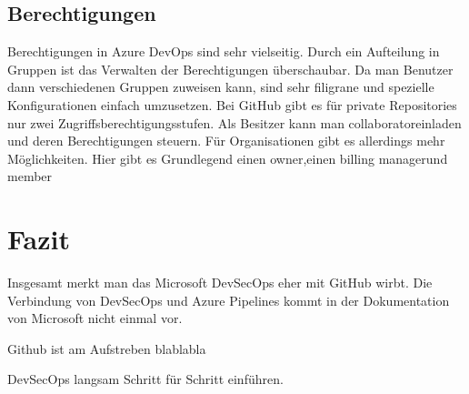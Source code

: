 \section{Berechtigungen}
Berechtigungen in Azure DevOps sind sehr vielseitig. Durch ein Aufteilung in Gruppen ist das Verwalten der Berechtigungen überschaubar. Da man Benutzer dann verschiedenen Gruppen zuweisen kann, sind sehr filigrane und spezielle Konfigurationen einfach umzusetzen. Bei GitHub gibt es für private Repositories nur zwei Zugriffsberechtigungsstufen. Als Besitzer kann man \glqq collaborator\grqq einladen und deren Berechtigungen steuern. Für Organisationen gibt es allerdings mehr Möglichkeiten. Hier gibt es Grundlegend einen \glqq owner\grqq ,einen \glqq billing manager\grqq und \glqq member\grqq

\chapter{Fazit}
Insgesamt merkt man das Microsoft DevSecOps eher mit GitHub wirbt. Die Verbindung von DevSecOps und Azure Pipelines kommt in der Dokumentation von Microsoft nicht einmal vor.

Github ist am Aufstreben blablabla

DevSecOps langsam Schritt für Schritt einführen.